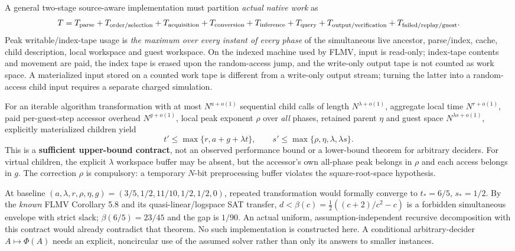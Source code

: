 \documentclass[11pt]{article}
\begin{document}
A general two-stage source-aware implementation must partition \emph{actual native work} as
\[
T=T_{\rm parse}+T_{\rm order/selection}+T_{\rm acquisition}
+T_{\rm conversion}+T_{\rm inference}+T_{\rm query}
+T_{\rm output/verification}+T_{\rm failed/replay/guest}.
\]
Peak writable/index-tape usage is \emph{the maximum over every instant of every phase} of the simultaneous live ancestor, parse/index, cache, child description, local workspace and guest workspace. On the indexed machine used by FLMV, input is read-only; index-tape contents and movement are paid, the index tape is erased upon the random-access jump, and the write-only output tape is not counted as work space. A materialized input stored on a counted work tape is different from a write-only output stream; turning the latter into a random-access child input requires a separate charged simulation.

For an iterable algorithm transformation with at most $N^{a+o(1)}$ sequential child calls of length $N^{\lambda+o(1)}$, aggregate local time $N^{r+o(1)}$, paid per-guest-step accessor overhead $N^{g+o(1)}$, local peak exponent $\rho$ over \emph{all} phases, retained parent $\eta$ and guest space $N^{\lambda s+o(1)}$, explicitly materialized children yield
\[
t'\le\max\{r,a+g+\lambda t\},\qquad
\boxed{s'\le\max\{\rho,\eta,\lambda,\lambda s\}}.\tag{5}
\]
This is a \textbf{sufficient upper-bound contract}, not an observed performance bound or a lower-bound theorem for arbitrary deciders. For virtual children, the explicit $\lambda$ workspace buffer may be absent, but the accessor's own all-phase peak belongs in $\rho$ and each access belongs in $g$. The correction $\rho$ is compulsory: a temporary $N$-bit preprocessing buffer violates the square-root-space hypothesis.

At baseline $(a,\lambda,r,\rho,\eta,g)=(3/5,1/2,11/10,1/2,1/2,0)$, repeated transformation would formally converge to $t_*=6/5$, $s_*=1/2$. By the \emph{known} FLMV Corollary 5.8 and its quasi-linear/logspace SAT transfer, $d<\beta(c)=\tfrac12((c+2)/c^2-c)$ is a forbidden simultaneous envelope with strict slack; $\beta(6/5)=23/45$ and the gap is $1/90$. An actual uniform, assumption-independent recursive decomposition with this contract would already contradict that theorem. No such implementation is constructed here. A conditional arbitrary-decider $A\mapsto\Phi(A)$ needs an explicit, noncircular use of the assumed solver rather than only its answers to smaller instances.
\end{document}
